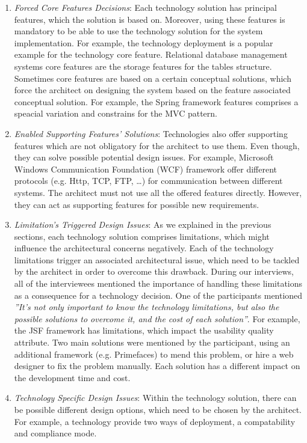 \documentclass[conference]{IEEEtran}
\begin{document}
\begin{enumerate}
\item \textit{Forced Core Features Decisions}: Each technology solution has
principal features, which the solution is based on. Moreover, using these
features is mandatory to be able to use the technology solution for the system
implementation. For example, the technology deployment is a popular example for
the technology core feature. Relational database management systems core
features are the storage features for the tables structure. Sometimes core
features are based on a certain conceptual solutions, which force the architect
on designing the system based on the feature associated conceptual solution. For
example, the Spring framework features comprises a speacial variation and
constrains for the MVC pattern.
\item \textit{Enabled Supporting Features' Solutions}: Technologies also offer
supporting features which are not obligatory for the architect to use them. Even though, they can solve possible
potential design issues. For example, Microsoft Windows Communication
Foundation (WCF) framework offer different protocols (e.g. Http, TCP, FTP, \ldots)
for communication between different systems. The architect must not use all the
offered features directly. However, they can act as supporting features for
possible new requirements.
\item \textit{Limitation's Triggered Design Issues}: As we explained in the
previous sections, each technology solution comprises limitations, which
might influence the architectural concerns negatively. Each of the technology
limitations trigger an associated architectural issue, which need to be tackled
by the architect in order to overcome this drawback. During our interviews, all
of the interviewees mentioned the importance of handling these limitations as a
consequence for a technology decision. One of the participants mentioned
\textit{''It's not only important to know the technology limitations, but also the possible
solutions to overcome it, and the cost of each solution''}. For example, the JSF
framework has limitations, which impact the usability quality attribute.
Two main solutions were mentioned by the participant, using an additional
framework (e.g. Primefaces) to mend this problem, or hire a web designer to fix
the problem manually. Each solution has a different impact on the development
time and cost.
\item \textit{Technology Specific Design Issues}: Within the technology
solution, there can be possible different design options, which need to be
chosen by the architect. For example, a technology provide two ways of
deployment, a compatability and compliance mode.
\end{enumerate}
\end{document}
